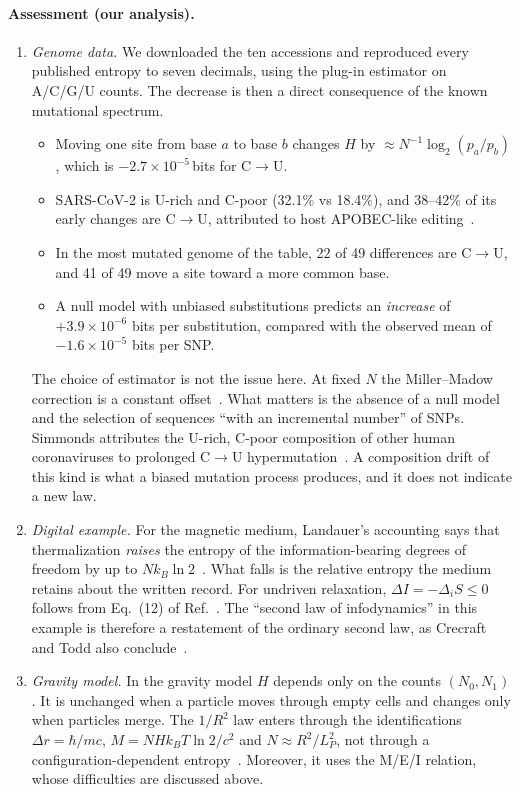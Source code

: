 \paragraph{Assessment (our analysis).}
\begin{enumerate}
\item \emph{Genome data.} We downloaded the ten accessions and reproduced every published entropy
  to seven decimals, using the plug-in estimator on A/C/G/U counts. The decrease is then a direct
  consequence of the known mutational spectrum.
  \begin{itemize}
  \item Moving one site from base $a$ to base $b$ changes $H$ by
    $\approx N^{-1}\log_2(p_a/p_b)$, which is $-2.7\times10^{-5}$\,bits for C$\to$U.
  \item SARS-CoV-2 is U-rich and C-poor (32.1\% vs 18.4\%), and 38--42\% of its early changes are
    C$\to$U, attributed to host APOBEC-like editing~\cite{Simmonds2020rampant}.
  \item In the most mutated genome of the table, 22 of 49 differences are C$\to$U, and 41 of 49
    move a site toward a more common base.
  \item A null model with unbiased substitutions predicts an \emph{increase} of
    $+3.9\times10^{-6}$ bits per substitution, compared with the observed mean of $-1.6\times10^{-5}$ bits per SNP.
  \end{itemize}
  The choice of estimator is not the issue here. At fixed $N$ the Miller--Madow correction is a
  constant offset~\cite{Paninski2003estimation}. What matters is the absence of a null model and
  the selection of sequences ``with an incremental number'' of SNPs. Simmonds attributes the U-rich, C-poor composition of other human coronaviruses to prolonged
  C$\to$U hypermutation~\cite{Simmonds2020rampant}. A composition drift of this kind is what a
  biased mutation process produces, and it does not indicate a new law.
\item \emph{Digital example.} For the magnetic medium, Landauer's accounting says that
  thermalization \emph{raises} the entropy of the information-bearing degrees of freedom by up to
  $Nk_B\ln2$~\cite{Landauer1961irreversibility}. What falls is the relative entropy the medium
  retains about the written record. For undriven relaxation, $\Delta I=-\Delta_iS\le0$ follows
  from Eq.~(12) of Ref.~\cite{Esposito2011second}. The ``second law of infodynamics'' in this
  example is therefore a restatement of the ordinary second law, as Crecraft and Todd also
  conclude~\cite{Crecraft2024second,Todd2026thermodynamic}.
\item \emph{Gravity model.} In the gravity model $H$ depends only on the counts $(N_0,N_1)$. It is
  unchanged when a particle moves through empty cells and changes only when particles merge. The
  $1/R^2$ law enters through the identifications $\Delta r=\hbar/mc$, $M=NHk_BT\ln2/c^2$ and
  $N\approx R^2/L_P^2$, not through a configuration-dependent entropy~\cite{Vopson2025is}.
  Moreover, it uses the M/E/I relation, whose difficulties are discussed above.
\end{enumerate}

